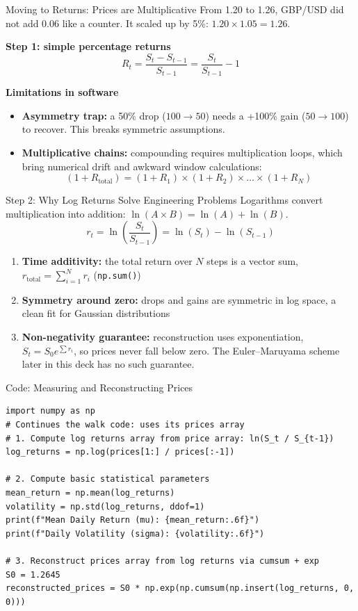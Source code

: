 \documentclass[aspectratio=169,11pt]{beamer}
\newcommand{\code}[1]{\texttt{#1}}
\begin{document}
\begin{frame}{Moving to Returns: Prices are Multiplicative}
  \small
  From 1.20 to 1.26, GBP/USD did not add 0.06 like a counter. It \alert{scaled up by 5\%}: $1.20 \times 1.05 = 1.26$.
  \medskip

  \textbf{Step 1: simple percentage returns}
  \[
    R_t = \frac{S_t - S_{t-1}}{S_{t-1}} = \frac{S_t}{S_{t-1}} - 1
  \]

  \textbf{Limitations in software}
  \begin{itemize}
    \item \textbf{Asymmetry trap:} a 50\% drop ($100 \rightarrow 50$) needs a +100\% gain ($50 \rightarrow 100$) to recover. This breaks symmetric assumptions.
    \item \textbf{Multiplicative chains:} compounding requires multiplication loops, which bring numerical drift and awkward window calculations:
    \[
      (1 + R_{\text{total}}) = (1 + R_1) \times (1 + R_2) \times \dots \times (1 + R_N)
    \]
  \end{itemize}
\end{frame}

\begin{frame}{Step 2: Why Log Returns Solve Engineering Problems}
  \small
  Logarithms convert multiplication into addition: $\ln(A \times B) = \ln(A) + \ln(B)$.
  \[
    r_t = \ln\left(\frac{S_t}{S_{t-1}}\right) = \ln(S_t) - \ln(S_{t-1})
  \]

  \begin{enumerate}
    \item \textbf{Time additivity:} the total return over $N$ steps is a vector sum, $r_{\text{total}} = \sum_{i=1}^{N} r_i$ (\code{np.sum()})
    \item \textbf{Symmetry around zero:} drops and gains are symmetric in log space, a clean fit for Gaussian distributions
    \item \textbf{Non-negativity guarantee:} reconstruction uses exponentiation, $S_t = S_0 e^{\sum r_i}$, so prices never fall below zero. The Euler--Maruyama scheme later in this deck has no such guarantee.
  \end{enumerate}
\end{frame}

\begin{frame}[fragile]{Code: Measuring and Reconstructing Prices}
\begin{lstlisting}
import numpy as np
# Continues the walk code: uses its prices array
# 1. Compute log returns array from price array: ln(S_t / S_{t-1})
log_returns = np.log(prices[1:] / prices[:-1])

# 2. Compute basic statistical parameters
mean_return = np.mean(log_returns)
volatility = np.std(log_returns, ddof=1)
print(f"Mean Daily Return (mu): {mean_return:.6f}")
print(f"Daily Volatility (sigma): {volatility:.6f}")

# 3. Reconstruct prices array from log returns via cumsum + exp
S0 = 1.2645
reconstructed_prices = S0 * np.exp(np.cumsum(np.insert(log_returns, 0, 0)))
\end{lstlisting}
\end{frame}
\end{document}
